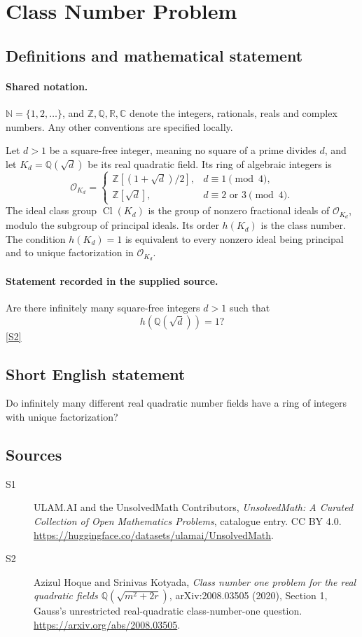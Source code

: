 \documentclass[11pt]{article}
\newcommand{\sref}[2]{\hyperlink{source:#1:#2}{[S#2]}}
\begin{document}
\section{Class Number Problem}\label{statement}

\subsection{Definitions and mathematical statement}

\paragraph{Shared notation.}$\mathbb N=\{1,2,\ldots\}$, and $\mathbb Z,\mathbb Q,\mathbb R,\mathbb C$ denote the integers, rationals, reals and complex numbers. Any other conventions are specified locally.


Let \(d>1\) be a square-free integer, meaning no square of a
prime divides \(d\), and let \(K_d=\mathbb Q(\sqrt d)\) be its
real quadratic field. Its ring of algebraic integers is
\[
 \mathcal O_{K_d}=\begin{cases}
   \mathbb Z[(1+\sqrt d)/2],&d\equiv1\pmod4,\\
   \mathbb Z[\sqrt d],&d\equiv2\text{ or }3\pmod4.
 \end{cases}
\]
The ideal class group \(\operatorname{Cl}(K_d)\) is the group
of nonzero fractional ideals of \(\mathcal O_{K_d}\), modulo
the subgroup of principal ideals. Its order \(h(K_d)\) is the class number.
The condition \(h(K_d)=1\) is equivalent to every nonzero ideal
being principal and to unique factorization in \(\mathcal O_{K_d}\).
\paragraph{Statement recorded in the supplied source.}
Are there infinitely many square-free integers \(d>1\)
such that
\[
                          h(\mathbb Q(\sqrt d))=1?
\] \sref{statement}{2}
\subsection{Short English statement}
Do infinitely many different real quadratic number fields have a ring of integers with unique factorization?
\subsection{Sources}
\begin{description}
\item[\hypertarget{source:statement:1}{S1}] ULAM.AI and the UnsolvedMath Contributors, \emph{UnsolvedMath: A Curated Collection of Open Mathematics Problems}, catalogue entry. CC BY 4.0. \url{https://huggingface.co/datasets/ulamai/UnsolvedMath}.
\item[\hypertarget{source:statement:2}{S2}] Azizul Hoque and Srinivas Kotyada, \emph{Class number one problem for the real quadratic fields $\mathbb Q(\sqrt{m^2+2r})$}, arXiv:2008.03505 (2020), Section 1, Gauss's unrestricted real-quadratic class-number-one question. \url{https://arxiv.org/abs/2008.03505}.
\end{description}
\label{end:statement}
\end{document}
